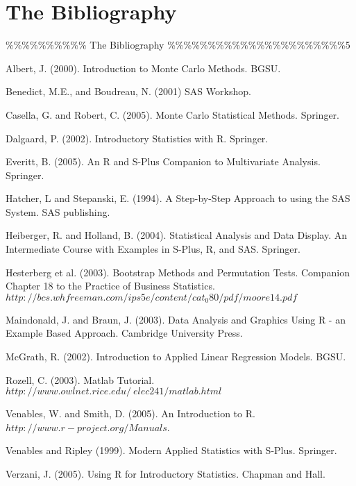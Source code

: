 \documentclass[11pt,english]{scrbook}
\begin{document}
\chapter{The Bibliography}
\label{sec:orge614cc6}


\%\%\%\%\%\%\%\%\%\%  The Bibliography \%\%\%\%\%\%\%\%\%\%\%\%\%\%\%\%\%\%\%\%\%\%5

\begin{thebibliography}{14}
Albert, J. (2000). Introduction to Monte Carlo Methods.
BGSU.

Benedict, M.E., and Boudreau, N. (2001) SAS\textregistered{}
Workshop.

Casella, G. and Robert, C. (2005). Monte Carlo Statistical
Methods. Springer.

Dalgaard, P. (2002). Introductory Statistics with R.
Springer.

Everitt, B. (2005). An R and S-Plus Companion to Multivariate
Analysis. Springer.

Hatcher, L and Stepanski, E. (1994). A Step-by-Step
Approach to using the SAS System. SAS publishing.

Heiberger, R. and Holland, B. (2004). Statistical
Analysis and Data Display. An Intermediate Course with Examples in
S-Plus, R, and SAS. Springer.

Hesterberg et al. (2003). Bootstrap Methods and Permutation
Tests. Companion Chapter 18 to the Practice of Business Statistics.
$http://bcs.whfreeman.com/ips5e/content/cat_{0}80/pdf/moore14.pdf$

Maindonald, J. and Braun, J. (2003). Data Analysis
and Graphics Using R - an Example Based Approach. Cambridge University
Press.

McGrath, R. (2002). Introduction to Applied Linear Regression Models. BGSU.

Rozell, C. (2003). Matlab Tutorial. $http://www.owlnet.rice.edu/~elec241/matlab.html$

Venables, W. and Smith, D. (2005). An Introduction
to R. $http://www.r-project.org/Manuals$.

Venables and Ripley (1999). Modern Applied Statistics
with S-Plus. Springer.

Verzani, J. (2005). Using R for Introductory Statistics.
Chapman and Hall. 
\end{thebibliography}
\end{document}
